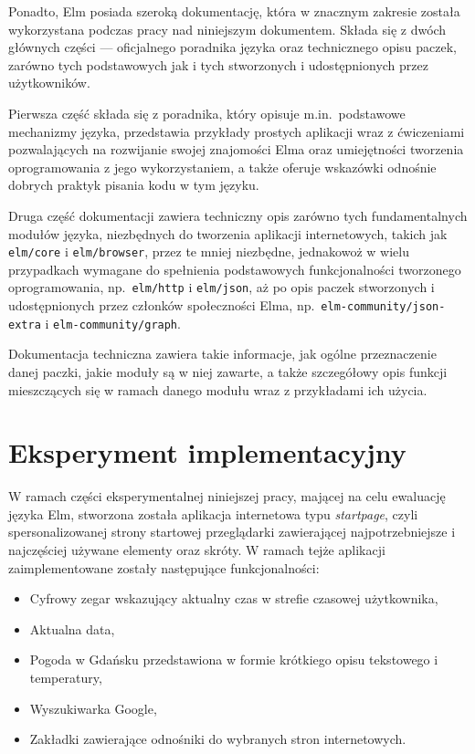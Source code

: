 \documentclass[twoside,a4paper]{report}
\begin{document}
Ponadto, Elm posiada szeroką dokumentację, która w znacznym zakresie została wykorzystana podczas pracy nad niniejszym dokumentem.
Składa się z dwóch głównych części --- oficjalnego poradnika języka oraz technicznego opisu paczek, zarówno tych podstawowych jak i tych stworzonych i udostępnionych przez użytkowników.

Pierwsza część składa się z poradnika, który opisuje m.in.~podstawowe mechanizmy języka, przedstawia przykłady prostych aplikacji wraz z ćwiczeniami pozwalających na rozwijanie swojej znajomości Elma oraz umiejętności tworzenia oprogramowania z jego wykorzystaniem, a także oferuje wskazówki odnośnie dobrych praktyk pisania kodu w tym języku.

Druga część dokumentacji zawiera techniczny opis zarówno tych fundamentalnych modułów języka, niezbędnych do tworzenia aplikacji internetowych, takich jak \texttt{elm/core} i \texttt{elm/browser}, przez te mniej niezbędne, jednakowoż w wielu przypadkach wymagane do spełnienia podstawowych funkcjonalności tworzonego oprogramowania, np.~\texttt{elm/http} i \texttt{elm/json}, aż po opis paczek stworzonych i udostępnionych przez członków społeczności Elma, np.~\texttt{elm-community/json-extra} i \texttt{elm-community/graph}.

Dokumentacja techniczna zawiera takie informacje, jak ogólne przeznaczenie danej paczki, jakie moduły są w niej zawarte, a także szczegółowy opis funkcji mieszczących się w ramach danego modułu wraz z przykładami ich użycia.


\chapter{Eksperyment implementacyjny}
W ramach części eksperymentalnej niniejszej pracy, mającej na celu ewaluację języka Elm, stworzona została aplikacja internetowa typu \textit{startpage}, czyli spersonalizowanej strony startowej przeglądarki zawierającej najpotrzebniejsze i najczęściej używane elementy oraz skróty.
W ramach tejże aplikacji zaimplementowane zostały następujące funkcjonalności:

\begin{itemize}[noitemsep,topsep=0pt]
    \item Cyfrowy zegar wskazujący aktualny czas w strefie czasowej użytkownika,
    \item Aktualna data,
    \item Pogoda w Gdańsku przedstawiona w formie krótkiego opisu tekstowego i temperatury,
    \item Wyszukiwarka Google,
    \item Zakładki zawierające odnośniki do wybranych stron internetowych.
\end{itemize}
\end{document}
